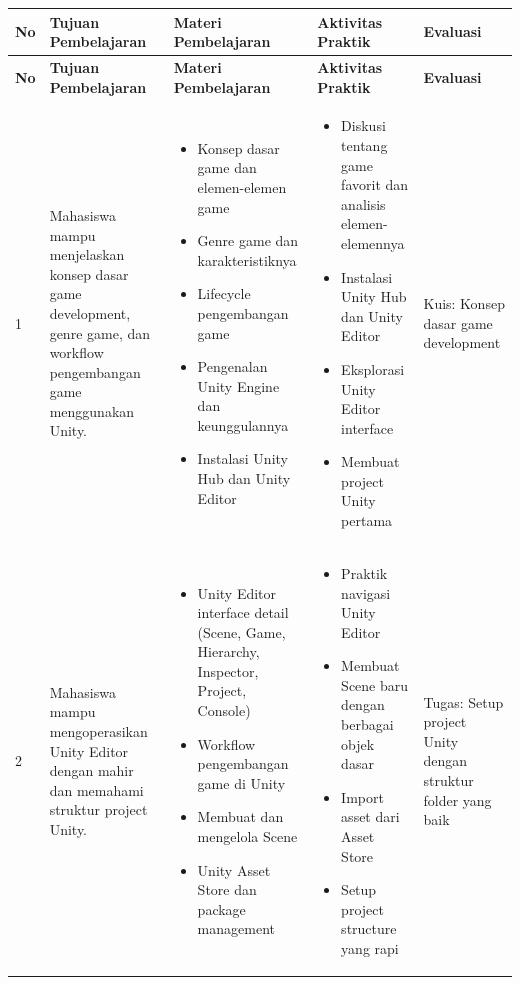 \documentclass[a4paper,12pt]{article}
\begin{document}
\begin{longtable}{|p{0.8cm}|p{3.5cm}|p{4cm}|p{4cm}|p{2.5cm}|}
\hline
\textbf{No} & \textbf{Tujuan Pembelajaran} & \textbf{Materi Pembelajaran} & \textbf{Aktivitas Praktik} & \textbf{Evaluasi} \\
\hline
\endfirsthead

\hline
\textbf{No} & \textbf{Tujuan Pembelajaran} & \textbf{Materi Pembelajaran} & \textbf{Aktivitas Praktik} & \textbf{Evaluasi} \\
\hline
\endhead

\hline
\endfoot

\hline
\endlastfoot

1 & Mahasiswa mampu menjelaskan konsep dasar game development, genre game, dan workflow pengembangan game menggunakan Unity. & 
\begin{itemize}[leftmargin=*,nosep]
\item Konsep dasar game dan elemen-elemen game
\item Genre game dan karakteristiknya
\item Lifecycle pengembangan game
\item Pengenalan Unity Engine dan keunggulannya
\item Instalasi Unity Hub dan Unity Editor
\end{itemize} & 
\begin{itemize}[leftmargin=*,nosep]
\item Diskusi tentang game favorit dan analisis elemen-elemennya
\item Instalasi Unity Hub dan Unity Editor
\item Eksplorasi Unity Editor interface
\item Membuat project Unity pertama
\end{itemize} & 
Kuis: Konsep dasar game development \\
\hline

2 & Mahasiswa mampu mengoperasikan Unity Editor dengan mahir dan memahami struktur project Unity. & 
\begin{itemize}[leftmargin=*,nosep]
\item Unity Editor interface detail (Scene, Game, Hierarchy, Inspector, Project, Console)
\item Workflow pengembangan game di Unity
\item Membuat dan mengelola Scene
\item Unity Asset Store dan package management
\end{itemize} & 
\begin{itemize}[leftmargin=*,nosep]
\item Praktik navigasi Unity Editor
\item Membuat Scene baru dengan berbagai objek dasar
\item Import asset dari Asset Store
\item Setup project structure yang rapi
\end{itemize} & 
Tugas: Setup project Unity dengan struktur folder yang baik \\
\hline


\end{longtable}
\end{document}

